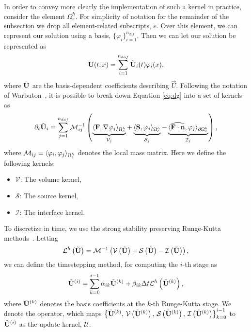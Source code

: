 In order to convey more clearly the implementation of such a kernel in practice, consider the element $\Omega_e^h$. For simplicity of notation for the remainder of the subsection we drop all element-related subscripts, $e$. Over this element, we can represent our solution using a basis, $\{ \varphi_i\}_{i=1}^{n_{dof}}$. Then we can let our solution be represented as
\begin{equation*}
{\bf U}(t,x) = \sum_{i=1}^{n_{dof}} \tilde{{\bf U}}_i(t) \varphi_i(x),
\end{equation*}
where $\tilde{{\bf U}}$ are the basis-dependent coefficients describing $\vec{U}$.
Following the notation of Warbuton~\cite{Gandham2015}, it is possible to break down Equation \eqref{eq:dg} into a set of kernels as 
\begin{equation}
\partial_t \tilde{{\bf U}}_i = \sum_{j=1}^{n_{dof}} \mathcal{M}_{ij}^{-1}\left( \underbrace{\langle {\bf F} , \nabla\varphi_j \rangle_{\Omega^h_e}}_{\mathcal{V}_{j}}  + \underbrace{\langle {\bf S} , \varphi_j \rangle_{\Omega^h_e}}_{\mathcal{S}_{j}} - \underbrace{\langle \widehat{{\bf F}\cdot {\bf n}} , \varphi_j \rangle_{\partial \Omega^h_e}}_{\mathcal{I}_{j}} \right),
\end{equation}
where $\mathcal{M}_{ij} = \langle \varphi_i , \varphi_j \rangle_{\Omega^h_e}$ denotes the local mass matrix.
Here we define the following kernels:
\begin{itemize}
\item $\mathcal{V}$: The volume kernel,
\item $\mathcal{S}$: The source kernel,
\item $\mathcal{I}$: The interface kernel.
\end{itemize}
To discretize in time, we use the strong stability preserving Runge-Kutta methods~\cite{Gottlieb2001}. Letting 
\begin{equation*}
\mathcal{L}^h \left(\tilde{{\bf U}} \right) = \mathcal{M}^{-1}\left( \mathcal{V}\left(\tilde{{\bf U}}\right) + \mathcal{S}\left(\tilde{{\bf U}}\right) - \mathcal{I}\left(\tilde{{\bf U}}\right) \right),
\end{equation*}
we can define the timestepping method, for computing the $i$-th stage as
\begin{equation*}
\tilde{{\bf U}}^{(i)} = \sum_{k=0}^{i-1} \alpha_{ik} \tilde{{\bf U}}^{(k)} + \beta_{ik} \Delta t \mathcal{L}^h\left(\tilde{{\bf U}}^{(k)}\right),
\end{equation*}
where $\tilde{{\bf U}}^{(k)}$ denotes the basis coefficients at the $k$-th Runge-Kutta stage.
We denote the operator, which maps $\left\{\tilde{{\bf U}}^{(k)},\,\mathcal{V}\left(\tilde{{\bf U}}^{(k)}\right),\,\mathcal{S}\left(\tilde{{\bf U}}^{(k)}\right),\,\mathcal{I}\left(\tilde{{\bf U}}^{(k)}\right)\right\}_{k=0}^{i-1}$ to $\tilde{{\bf U}}^{(i)}$ as the update kernel, $\mathcal{U}$.

